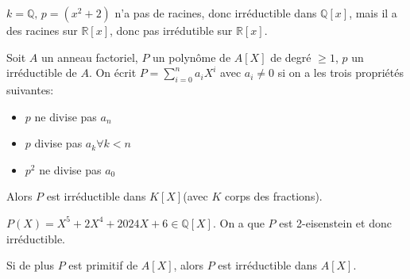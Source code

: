 \begin{exemple}
	$k = \mathbb{Q}, \,p = (x^2 + 2 )$ n'a pas de racines, donc irréductible dans $\mathbb{Q}[x]$, mais il a des racines sur $\mathbb{R}[x]$, donc pas irrédutible sur $\mathbb{R}[x]$.
\end{exemple}


\begin{theorem}
	Soit $A$ un anneau factoriel, $P$ un polynôme  de $A[X]$ de degré $\geq 1$, $p$ un irréductible de $A$.
	On écrit $P = \sum_{i=0}^n a_iX^i$ avec $a_i \neq 0$ si on a les trois propriétés suivantes:
	\begin{itemize}
		\item $p$ ne divise pas $a_n$
		\item $p$ divise pas $a_k \forall k < n$
		\item $p^2$ ne divise pas $a_0$
	\end{itemize}
	Alors $P$ est irréductible dans $K[X]$(avec $K$ corps des fractions).
\end{theorem}

\begin{exemple}
	$P(X) = X^5 + 2X^4 + 2024X + 6\in \mathbb{Q}[X]$. On a que $P$ est 2-eisenstein et donc irréductible.
\end{exemple}



\begin{coro}
	Si de plus $P$ est primitif de $A[X]$, alors $P$ est irréductible dans $A[X]$.
\end{coro}
